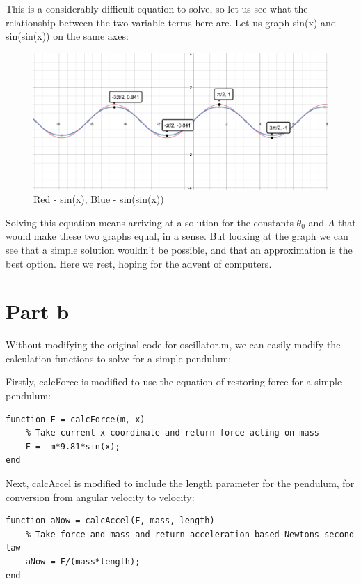 \documentclass{article}
\begin{document}
This is a considerably difficult equation to solve, so let us see what the relationship between the two variable terms here are. Let us graph sin(x) and sin(sin(x)) on the same axes:

\begin{figure}[H]
\caption{Red - sin(x), Blue - sin(sin(x))}
\includegraphics[width=\textwidth]{ExternalGraph}
\end{figure}

Solving this equation means arriving at a solution for the constants $\theta_0$ and $A$ that would make these two graphs equal, in a sense. But looking at the graph we can see that a simple solution wouldn't be possible, and that an approximation is the best option. Here we rest, hoping for the advent of computers.
 
\section{Part b}

Without modifying the original code for oscillator.m, we can easily modify the calculation functions to solve for a simple pendulum:

Firstly, calcForce is modified to use the equation of restoring force for a simple pendulum:
\begin{lstlisting}
function F = calcForce(m, x)
    % Take current x coordinate and return force acting on mass
    F = -m*9.81*sin(x);
end
\end{lstlisting}

Next, calcAccel is modified to include the length parameter for the pendulum, for conversion from angular velocity to velocity:
\begin{lstlisting}
function aNow = calcAccel(F, mass, length)
    % Take force and mass and return acceleration based Newtons second law    
    aNow = F/(mass*length);
end
\end{lstlisting}
\end{document}
